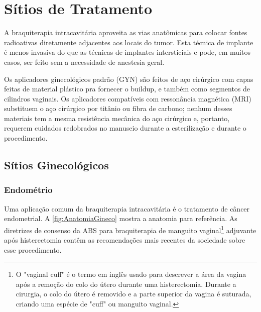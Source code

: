 \documentclass[11pt,a4paper]{article}
\begin{document}
\section{Sítios de Tratamento}

	A braquiterapia intracavitária aproveita as vias anatômicas para colocar fontes radioativas diretamente adjacentes aos locais do tumor. Esta técnica de implante é menos invasiva do que as técnicas de implantes intersticiais e pode, em muitos casos, ser feito sem a necessidade de anestesia geral.

	Os aplicadores ginecológicos padrão (GYN) são feitos de aço cirúrgico com capas feitas de material plástico pra fornecer o buildup, e também como segmentos de cilindros vaginais. Os aplicadores compatíveis com ressonância magnética (MRI) substituem o aço cirúrgico por titânio ou fibra de carbono; nenhum desses materiais tem a mesma resistência mecânica do aço cirúrgico e, portanto, requerem cuidados redobrados no manuseio durante a esterilização e durante o procedimento.

\subsection{Sítios Ginecológicos}

\subsubsection*{Endométrio}

	Uma aplicação comum da braquiterapia intracavitária é o tratamento de câncer endometrial. A \ref{fig:AnatomiaGineco} mostra a anatomia para referência. As diretrizes de consenso da ABS para braquiterapia de manguito vaginal\footnote{O "vaginal cuff" é o termo em inglês usado para descrever a área da vagina após a remoção do colo do útero durante uma histerectomia. Durante a cirurgia, o colo do útero é removido e a parte superior da vagina é suturada, criando uma espécie de "cuff" ou manguito vaginal.} adjuvante após histerectomia contêm as recomendações mais recentes da sociedade sobre esse procedimento.
\end{document}
